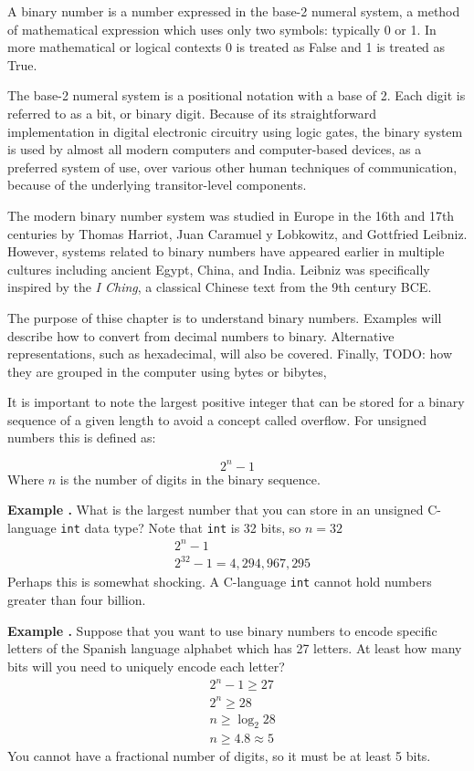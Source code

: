 \documentclass[letterpaper, 12pt]{book}
\newcommand*{\example}[1]{\noindent
    \colorbox{blue!10}{\noindent
        \begin{minipage}{\textwidth}
            \textbf{Example \thechapter.\arabic{examples}}\stepcounter{examples}
            #1
        \end{minipage}
    }
}
\begin{document}
A binary number is a number expressed in the base-2 numeral system, a method of mathematical 
expression which uses only two symbols: typically 0 or 1. In more mathematical or logical contexts 
0 is treated as False and 1 is treated as True.

The base-2 numeral system is a positional notation with a base of 2. Each digit is referred to as 
a bit, or binary digit. Because of its straightforward implementation in digital electronic 
circuitry using logic gates, the binary system is used by almost all modern computers and 
computer-based devices, as a preferred system of use, over various other human techniques of 
communication, because of the underlying transitor-level components.

The modern binary number system was studied in Europe in the 16th and 17th centuries by Thomas 
Harriot, Juan Caramuel y Lobkowitz, and Gottfried Leibniz. However, systems related to binary 
numbers have appeared earlier in multiple cultures including ancient Egypt, China, and India. 
Leibniz was specifically inspired by the \textit{I Ching}, a classical Chinese text from the 9th century BCE. 

The purpose of thise chapter is to understand binary numbers. Examples will describe how to convert
from decimal numbers to binary. Alternative representations, such as hexadecimal, will also be
covered. Finally, TODO: how they are grouped in the computer using bytes or bibytes, 



It is important to note the largest positive integer that can be stored for a binary sequence of a 
given length to avoid a concept called \gls{overflow}. For \gls{unsigned} numbers this is defined as: %

%
\begin{equation} \label{eq:sizeofunsignedint}
    2^n - 1
\end{equation}
%
Where $n$ is the number of digits in the binary sequence. 

\example{What is the largest number that you can store in an unsigned C-language \texttt{int} data type? %
Note that \texttt{int} is 32 bits, so $n=32$
\begin{align*}%
    & 2^n-1 \\
    & 2^{32} - 1 = 4,294,967,295
\end{align*}%
Perhaps this is somewhat shocking. A C-language \texttt{int} cannot hold numbers greater than four billion.
}

\example{Suppose that you want to use binary numbers to encode specific letters of the Spanish language %
alphabet which has 27 letters. At least how many bits will you need to uniquely encode each letter?
\begin{align*}
    & 2^n-1 \geq 27 \\
    & 2^n \geq 28 \\
    & n \geq \log_2 28 \\
    & n \geq 4.8 \approx 5
\end{align*}
You cannot have a fractional number of digits, so it must be at least 5 bits.
}
\end{document}
